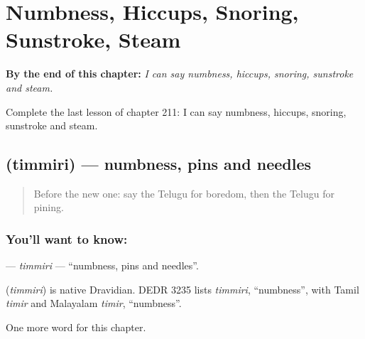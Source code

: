 
\chapter{Numbness, Hiccups, Snoring, Sunstroke, Steam}
\label{ch:te-numbness-hiccups-snoring-sunstroke-steam}

\begin{chapteropening}
\textbf{By the end of this chapter:} \emph{I can say numbness, hiccups, snoring, sunstroke and steam.}

Complete the last lesson of chapter 211: I can say numbness, hiccups, snoring, sunstroke and steam.
\end{chapteropening}

\section[\texorpdfstring{\te{తిమ్మిరి} (timmiri)}{తిమ్మిరి (timmiri)}]{ (timmiri) — numbness, pins and needles}

\label{lesson:TE-C211-timmiri}



\begin{quote}
Before the new one: say the Telugu for boredom, then the Telugu for pining.
\end{quote}

\subsection*{You'll want to know: }
\textbf{} — \emph{timmiri} — \textquotedblleft{}numbness, pins and needles\textquotedblright{}.

\begin{cousinweb}
\textbf{} (\emph{timmiri}) is native Dravidian. DEDR 3235 lists \emph{timmiri}, \textquotedblleft{}numbness\textquotedblright{}, with Tamil \emph{timir} and Malayalam \emph{timir}, \textquotedblleft{}numbness\textquotedblright{}.
\end{cousinweb}

\begin{grammarlens}[title={What you've built}]
One more word for this chapter.
\end{grammarlens}

